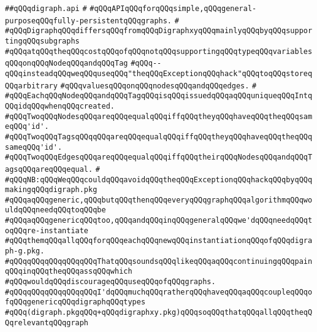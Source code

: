 \label{src/lib/src/digraph.api}
\verb|##qQQqdigraph.api|\newline
\verb|#|\newline
\verb|#qQQqAPIqQQqforqQQqsimple,qQQqgeneral-purposeqQQqfully-persistentqQQqgraphs.|\newline
\verb|#|\newline
\verb|#qQQqDigraphqQQqdiffersqQQqfromqQQqDigraphxyqQQqmainlyqQQqbyqQQqsupportingqQQqsubgraphs|\newline
\verb|#qQQqatqQQqtheqQQqcostqQQqofqQQqnotqQQqsupportingqQQqtypeqQQqvariablesqQQqonqQQqNodeqQQqandqQQqTag|\newline
\verb|#qQQq--qQQqinsteadqQQqweqQQquseqQQq"theqQQqExceptionqQQqhack"qQQqtoqQQqstoreqQQqarbitrary|\newline
\verb|#qQQqvaluesqQQqonqQQqnodesqQQqandqQQqedges.|\newline
\verb|#|\newline
\verb|#qQQqEachqQQqNodeqQQqandqQQqTagqQQqisqQQqissuedqQQqaqQQquniqueqQQqIntqQQqidqQQqwhenqQQqcreated.|\newline
\verb|#qQQqTwoqQQqNodesqQQqareqQQqequalqQQqiffqQQqtheyqQQqhaveqQQqtheqQQqsameqQQq'id'.|\newline
\verb|#qQQqTwoqQQqTagsqQQqqQQqareqQQqequalqQQqiffqQQqtheyqQQqhaveqQQqtheqQQqsameqQQq'id'.|\newline
\verb|#qQQqTwoqQQqEdgesqQQqareqQQqequalqQQqiffqQQqtheirqQQqNodesqQQqandqQQqTagsqQQqareqQQqequal.|\newline
\verb|#|\newline
\verb|#qQQqNB:qQQqWeqQQqcouldqQQqavoidqQQqtheqQQqExceptionqQQqhackqQQqbyqQQqmakingqQQqdigraph.pkg|\newline
\verb|#qQQqaqQQqgeneric,qQQqbutqQQqthenqQQqeveryqQQqgraphqQQqalgorithmqQQqwouldqQQqneedqQQqtoqQQqbe|\newline
\verb|#qQQqaqQQqgenericqQQqtoo,qQQqandqQQqinqQQqgeneralqQQqwe'dqQQqneedqQQqtoqQQqre-instantiate|\newline
\verb|#qQQqthemqQQqallqQQqforqQQqeachqQQqnewqQQqinstantiationqQQqofqQQqdigraph-g.pkg.|\newline
\verb|#qQQqqQQqqQQqqQQqqQQqThatqQQqsoundsqQQqlikeqQQqaqQQqcontinuingqQQqpainqQQqinqQQqtheqQQqassqQQqwhich|\newline
\verb|#qQQqwouldqQQqdiscourageqQQquseqQQqofqQQqgraphs.|\newline
\verb|#qQQqqQQqqQQqqQQqqQQqI'dqQQqmuchqQQqratherqQQqhaveqQQqaqQQqcoupleqQQqofqQQqgenericqQQqdigraphqQQqtypes|\newline
\verb|#qQQq(digraph.pkgqQQq+qQQqdigraphxy.pkg)qQQqsoqQQqthatqQQqallqQQqtheqQQqrelevantqQQqgraph|\newline
